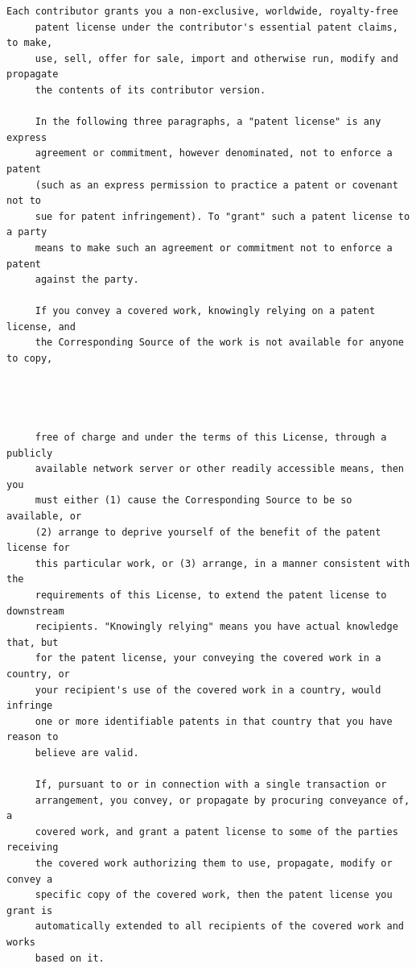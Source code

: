 \begin{lstlisting}[basicstyle=\ttfamily\footnotesize,breaklines=true]
     Each contributor grants you a non-exclusive, worldwide, royalty-free
     patent license under the contributor's essential patent claims, to make,
     use, sell, offer for sale, import and otherwise run, modify and propagate
     the contents of its contributor version.

     In the following three paragraphs, a "patent license" is any express
     agreement or commitment, however denominated, not to enforce a patent
     (such as an express permission to practice a patent or covenant not to
     sue for patent infringement). To "grant" such a patent license to a party
     means to make such an agreement or commitment not to enforce a patent
     against the party.

     If you convey a covered work, knowingly relying on a patent license, and
     the Corresponding Source of the work is not available for anyone to copy,




     free of charge and under the terms of this License, through a publicly
     available network server or other readily accessible means, then you
     must either (1) cause the Corresponding Source to be so available, or
     (2) arrange to deprive yourself of the benefit of the patent license for
     this particular work, or (3) arrange, in a manner consistent with the
     requirements of this License, to extend the patent license to downstream
     recipients. "Knowingly relying" means you have actual knowledge that, but
     for the patent license, your conveying the covered work in a country, or
     your recipient's use of the covered work in a country, would infringe
     one or more identifiable patents in that country that you have reason to
     believe are valid.

     If, pursuant to or in connection with a single transaction or
     arrangement, you convey, or propagate by procuring conveyance of, a
     covered work, and grant a patent license to some of the parties receiving
     the covered work authorizing them to use, propagate, modify or convey a
     specific copy of the covered work, then the patent license you grant is
     automatically extended to all recipients of the covered work and works
     based on it.


\end{lstlisting}
